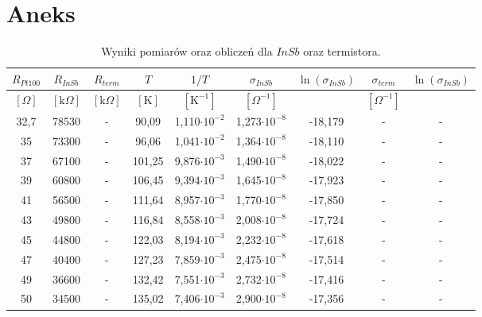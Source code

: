 \documentclass[11pt]{article}
\begin{document}
\newpage
\section*{Aneks}

\begin{table}[h!]
\centering
\caption{Wyniki pomiarów oraz obliczeń dla $InSb$ oraz termistora.}
\label{my-label}
\begin{tabular}{|c|c|c|c|c|c|c|c|c|}
\hline
$R_{Pt100}$     & $R_{InSb}$  & $R_{term}$ & $T$    & $1/T$  & $\sigma_{InSb}$     & $\ln (\sigma_{InSb})$    & $\sigma_{term}$      & $\ln (\sigma_{InSb})$    \\ \hline
$[\Omega]$  & $[\mbox{k}\Omega]$ &$[\mbox{k}\Omega]$ & $[\mbox{K}]$ & $[\mbox{K}^{-1}]$ & $[\Omega^{-1}]$ && $[\Omega^{-1}]$ & \\ \hline
32,7           & 78530          & -       & 90,09 & 1,110$\cdot10^{-2}$ &  1,273$\cdot10^{-8}$&-18,179 & -           & -     \\ \hline
35             & 73300          & -       & 96,06 & 1,041$\cdot10^{-2}$ &  1,364$\cdot10^{-8}$&-18,110 & -           & -     \\ \hline
37             & 67100          & -       & 101,25 & 9,876$\cdot10^{-3}$ & 1,490$\cdot10^{-8}$&-18,022 & -           & -     \\ \hline
39             & 60800          & -       & 106,45 & 9,394$\cdot10^{-3}$ & 1,645$\cdot10^{-8}$&-17,923 & -           & -     \\ \hline
41             & 56500          & -       & 111,64 & 8,957$\cdot10^{-3}$ & 1,770$\cdot10^{-8}$&-17,850 & -           & -     \\ \hline
43             & 49800          & -       & 116,84 & 8,558$\cdot10^{-3}$ & 2,008$\cdot10^{-8}$&-17,724 & -           & -     \\ \hline
45             & 44800          & -       & 122,03 & 8,194$\cdot10^{-3}$ & 2,232$\cdot10^{-8}$&-17,618 & -           & -     \\ \hline
47             & 40400          & -       & 127,23 & 7,859$\cdot10^{-3}$ & 2,475$\cdot10^{-8}$&-17,514 & -           & -     \\ \hline
49             & 36600          & -       & 132,42 & 7,551$\cdot10^{-3}$ & 2,732$\cdot10^{-8}$&-17,416 & -           & -     \\ \hline
50             & 34500          & -       & 135,02 & 7,406$\cdot10^{-3}$ & 2,900$\cdot10^{-8}$&-17,356 & -           & -     \\ \hline

\end{tabular}
\end{table}
\end{document}
